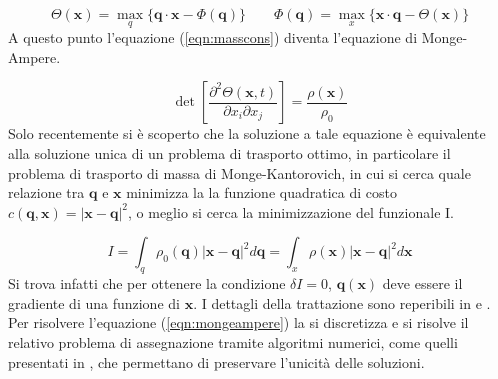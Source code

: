 \begin{equation}
    \Theta(\bm{x}) = \max_q \{\bm{q}\cdot\bm{x}-\Phi(\bm{q})\} \qquad \Phi(\bm{q}) = \max_x \{\bm{x}\cdot\bm{q}-\Theta(\bm{x})\}
\end{equation}
A questo punto l'equazione (\ref{eqn:masscons}) diventa l'equazione di Monge-Ampere.

\begin{equation}
    \det\left[\frac{\partial^2 \Theta (\bm{x}, t)}{\partial x_i \partial x_j}\right] = \frac{\rho(\bm{x})}{\rho_0}
\end{equation}
Solo recentemente si è scoperto che la soluzione a tale equazione è equivalente alla soluzione unica
di un problema di trasporto ottimo, in particolare il problema di trasporto di massa di Monge-Kantorovich,
in cui si cerca quale relazione tra $\bm{q}$ e $\bm{x}$ minimizza la la funzione quadratica di costo 
$c(\bm{q}, \bm{x}) = |\bm{x}-\bm{q}|^2$, o meglio si cerca la minimizzazione del funzionale I.

\begin{equation}
    \label{eqn:mongeampere}
    I = \int_q \rho_0(\bm{q})|\bm{x}-\bm{q}|^2 d\bm{q} = \int_x \rho(\bm{x})|\bm{x}-\bm{q}|^2 d\bm{x} 
\end{equation}
Si trova infatti che per ottenere la condizione $\delta I = 0$, $\bm{q}(\bm{x})$ deve essere il gradiente
di una funzione di $\bm{x}$. I dettagli della trattazione sono reperibili in \cite{mohayaee} e \cite{matarrese}.
Per risolvere l'equazione (\ref{eqn:mongeampere}) la si discretizza e si risolve il relativo problema di assegnazione 
tramite algoritmi numerici, come quelli presentati in \cite{mohayaee}, che permettano di preservare l'unicità
delle soluzioni.

